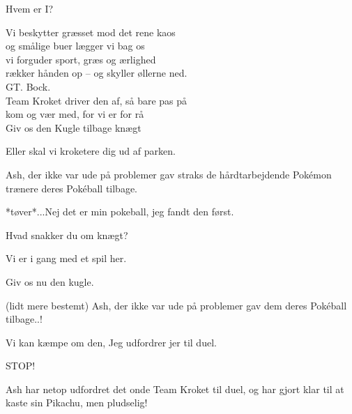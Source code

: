 \documentclass[a4paper,11pt]{article}
\begin{document}
\begin{sketch}

 Hvem er I?


 Vi beskytter græsset mod det rene kaos \\
og smålige buer lægger vi bag os \\
vi forguder sport, græs og ærlighed \\
rækker hånden op -- og skyller øllerne ned. \\
GT. Bock. \\
Team Kroket driver den af, så bare pas på \\
kom og vær med, for vi er for rå \\

 Giv os den Kugle tilbage knægt

 Eller skal vi kroketere dig ud af parken.

 Ash, der ikke var ude på problemer gav straks de hårdtarbejdende Pokémon trænere deres Pokéball tilbage.

 *tøver*...Nej det er min pokeball, jeg fandt den først.

 Hvad snakker du om knægt?

 Vi er i gang med et spil her.

 Giv os nu den kugle.

 (lidt mere bestemt) Ash, der ikke var ude på problemer gav dem deres Pokéball tilbage..!

 Vi kan kæmpe om den, Jeg udfordrer jer til duel.


 STOP!




 Ash har netop udfordret det onde Team Kroket til duel, og har gjort klar til at kaste sin Pikachu, men pludselig!



\end{sketch}
\end{document}
